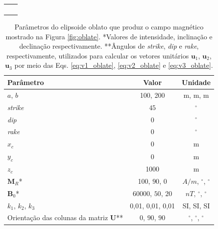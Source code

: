 \begin{table}[h!]
	\begin{center}
		\begin{tabular}{lc}
		
			 &  \\
			 & \\
			 & \\
			 & \\
\end{tabular}
\end{center}
\end{table}

\begin{table}[h!]
	\begin{center}
		\begin{tabular}{|l|c|c|}
			\hline
			\textbf{Parâmetro}  & \textbf{Valor} & \textbf{Unidade} \\
			\hline 
			$a$, $b$  & 100, 200 & m, m, m \\
			\hline
			\textit{strike}   & $45$ &  $^{\circ}$\\
			\hline
			\textit{dip}    & $0$ &  $^{\circ}$\\
			\hline
			\textit{rake}   & $0$  &  $^{\circ}$\\
			\hline
			$x_c $  & 0  & m\\
			\hline          
			$y_c$   & 0  & m\\
			\hline                
			$z_c$   & 1000  & m\\
			\hline
			$\mathbf{M}_{R}$*  & 100, $90$, $0$  & $A/m$, $^{\circ}$, $^{\circ}$\\
			\hline
			$\mathbf{B}_{0}$*    & 60000, $50$, $20$ & $nT$, $^{\circ}$, $^{\circ}$\\
			\hline
			$k_{1}$, $k_{2}$, $k_{3}$   & 0,01, 0,01, 0,01  & SI, SI, SI\\
			\hline
			Orientação das colunas da matriz $\mathbf{U}$**   & $0$, $90$, $90$  &  $^{\circ}$,  $^{\circ}$,  $^{\circ}$\\
			\hline
		\end{tabular}
		\caption{Parâmetros do elipsoide oblato que produz o campo magnético mostrado na Figura \ref{fig:oblate}. *Valores de intensidade, inclinação e declinação respectivamente. **Ângulos de \textit{strike}, \textit{dip}  e \textit{rake}, respectivamente, utilizados para calcular os vetores unitários $\mathbf{u}_{1}$, $\mathbf{u}_{2}$, $\mathbf{u}_{3}$ por meio das Eqs. \ref{eq:v1_oblate}, \ref{eq:v2_oblate} e \ref{eq:v3_oblate}.}
	\end{center}
	\label{tab:oblate}
\end{table}

